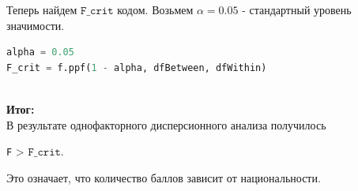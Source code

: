 \documentclass[14pt]{extreport}
\begin{document}
Теперь найдем $\mathtt{F\_crit}$ кодом. Возьмем $\alpha = 0.05$ - стандартный уровень значимости.

	\begin{lstlisting}[language=python, caption=\texttt{F}-статистика]
alpha = 0.05
F_crit = f.ppf(1 - alpha, dfBetween, dfWithin)
\end{lstlisting}

\noindent
{}
\\



\textbf{Итог:} \\
В результате однофакторного дисперсионного анализа получилось

\begin{center}
	\texttt{F} > $\mathtt{F\_crit}$.
\end{center}
Это означает, что количество баллов зависит от национальности.	
\end{document}
